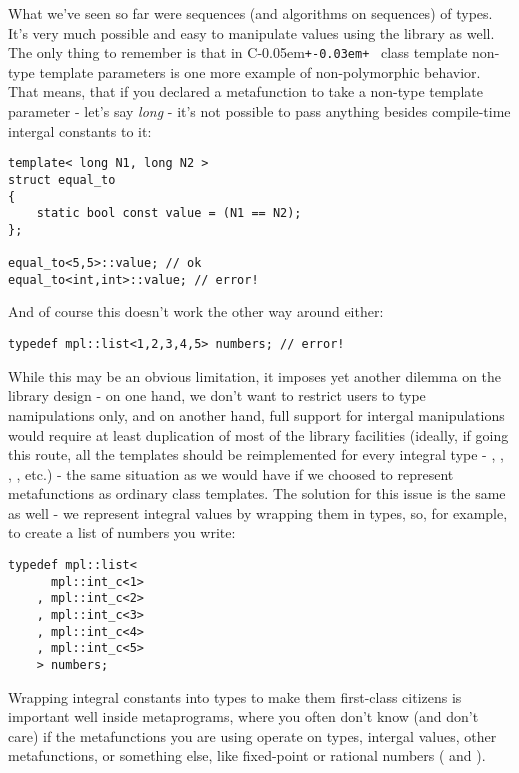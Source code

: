 \documentclass{netobjectdays}
\newcommand{\Cpp}{C\kern-0.05em\texttt{+\kern-0.03em+}%
}
\begin{document}
What we've seen so far were sequences (and algorithms on 
sequences) of types. It's very much possible and easy to 
manipulate values using the library as well. The only thing 
to remember is that in \Cpp\ class template non-type template 
parameters is one more example of non-polymorphic behavior. %
That means, that if you declared a metafunction to take a 
non-type template parameter - let's say \emph{long} - 
it's not possible to pass anything besides compile-time 
intergal constants to it:

{\footnotesize
\begin{verbatim}
template< long N1, long N2 >
struct equal_to
{
    static bool const value = (N1 == N2);
};

equal_to<5,5>::value; // ok
equal_to<int,int>::value; // error!
\end{verbatim}
}

And of course this doesn't work the other way around either:

{\footnotesize
\begin{verbatim}
typedef mpl::list<1,2,3,4,5> numbers; // error!
\end{verbatim}
}

While this may be an obvious limitation, it imposes yet 
another dilemma on the library design - on one hand, we don't 
want to restrict users to type namipulations only, and on another 
hand, full support for intergal manipulations would require at 
least duplication of most of the library facilities (ideally, 
if going this route, all the templates should be reimplemented 
for every integral type - , , ,
, etc.) - the same situation as we would have if we 
choosed to represent metafunctions as ordinary class templates.
The solution for this issue is the same as well - we represent 
integral values by wrapping them in types, so, for example, to 
create a list of numbers you write:

{\footnotesize
\begin{verbatim}
typedef mpl::list<
      mpl::int_c<1>
    , mpl::int_c<2>
    , mpl::int_c<3>
    , mpl::int_c<4>
    , mpl::int_c<5>
    > numbers;
\end{verbatim}
}

Wrapping integral constants into types to make them 
first-class citizens is important well inside metaprograms, 
where you often don't know (and don't care) if the 
metafunctions you are using operate on types, intergal 
values, other metafunctions, or something else, like 
fixed-point or rational numbers ( 
and ).
\end{document}
